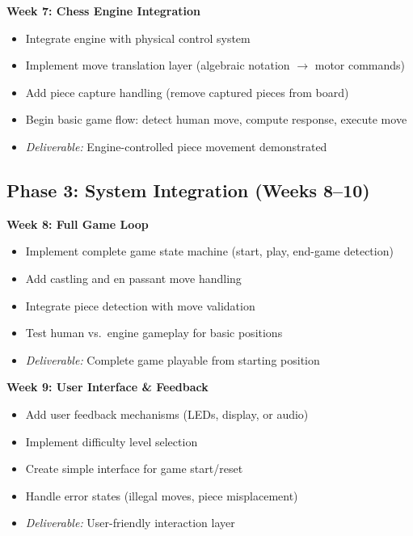 \documentclass[11pt]{article}
\begin{document}
\noindent\textbf{Week 7: Chess Engine Integration}
\begin{itemize}[noitemsep, leftmargin=2em]
    \item Integrate engine with physical control system
    \item Implement move translation layer (algebraic notation $\rightarrow$ motor commands)
    \item Add piece capture handling (remove captured pieces from board)
    \item Begin basic game flow: detect human move, compute response, execute move
    \item \textit{Deliverable:} Engine-controlled piece movement demonstrated
\end{itemize}

\vspace{0.5em}

\subsection*{\textcolor{phaseC}{Phase 3: System Integration (Weeks 8--10)}}

\noindent\textbf{Week 8: Full Game Loop}
\begin{itemize}[noitemsep, leftmargin=2em]
    \item Implement complete game state machine (start, play, end-game detection)
    \item Add castling and en passant move handling
    \item Integrate piece detection with move validation
    \item Test human vs.\ engine gameplay for basic positions
    \item \textit{Deliverable:} Complete game playable from starting position
\end{itemize}

\noindent\textbf{Week 9: User Interface \& Feedback}
\begin{itemize}[noitemsep, leftmargin=2em]
    \item Add user feedback mechanisms (LEDs, display, or audio)
    \item Implement difficulty level selection
    \item Create simple interface for game start/reset
    \item Handle error states (illegal moves, piece misplacement)
    \item \textit{Deliverable:} User-friendly interaction layer
\end{itemize}
\end{document}

